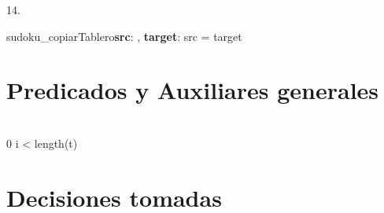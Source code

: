 \documentclass[a4paper]{article}
\begin{document}
14. \begin{proc}{sudoku\_copiarTablero}{\textbf{\In src}: \matriz{\ent}, \textbf{\Out target}: \matriz{\ent}}{}{}
       \pre{\True}
       \post
			{
			src = target
			}
    \end{proc}



\section{Predicados y Auxiliares generales}


		

		{\\
			0 \leq  i < length(t)\\
		}
		
	
		
        
		
\section{Decisiones tomadas}
\end{document}
